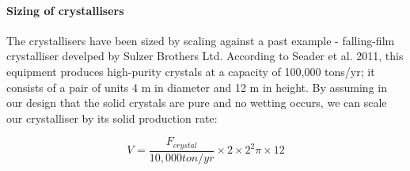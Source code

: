\paragraph{Sizing of crystallisers}
The crystallisers have been sized by scaling against a past example - falling-film crystalliser develped by Sulzer Brothers Ltd. According to Seader et al. 2011, \cite{seader_separation_2011} this equipment produces high-purity crystals at a capacity of 100,000 tons/yr; it consists of a pair of units 4 m in diameter and 12 m in height. By assuming in our design that the solid crystals are pure and no wetting occurs, we can scale our crystalliser by its solid production rate:

\begin{equation}
    V_{} = \frac{F_{crystal}}{10,000 ton/yr} \times 2 \times 2^2 \pi \times 12
    \label{crystalliser_sizing}
\end{equation}

